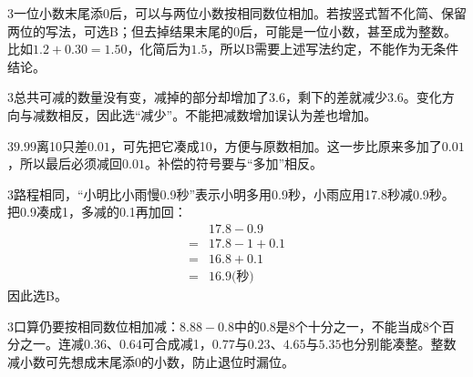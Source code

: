 \documentclass[multi=snippet,border={5bp 20bp 5bp 5bp}]{standalone}
\newenvironment{snippet}[3]{\begin{minipage}{#1bp}\color{answerred}\fontsize{#2}{#3}\selectfont\raggedright}{\end{minipage}}
\begin{document}
\begin{snippet}{505}{11.5}{14}\begin{multicols}{3}\raggedcolumns 一位小数末尾添0后，可以与两位小数按相同数位相加。若按竖式暂不化简、保留两位的写法，可选B；但去掉结果末尾的0后，可能是一位小数，甚至成为整数。比如\(1.2+0.30=1.50\)\allowbreak ，化简后为\(1.5\)\allowbreak ，所以B需要上述写法约定，不能作为无条件结论。\end{multicols}\end{snippet}
\begin{snippet}{505}{11.5}{14}\begin{multicols}{3}\raggedcolumns 总共可减的数量没有变，减掉的部分却增加了\(3.6\)\allowbreak ，剩下的差就减少\(3.6\)\allowbreak 。变化方向与减数相反，因此选“减少”。不能把减数增加误认为差也增加。\end{multicols}\end{snippet}
\begin{snippet}{505}{11.5}{14}\begin{multicols}{3}\raggedcolumns \(9.99\)\allowbreak 离10只差\(0.01\)\allowbreak ，可先把它凑成10，方便与原数相加。这一步比原来多加了\(0.01\)\allowbreak ，所以最后必须减回\(0.01\)\allowbreak 。补偿的符号要与“多加”相反。\end{multicols}\end{snippet}
\begin{snippet}{505}{11.5}{14}\begin{multicols}{3}\raggedcolumns 路程相同，“小明比小雨慢0.9秒”表示小明多用0.9秒，小雨应用17.8秒减0.9秒。把0.9凑成1，多减的0.1再加回：\[\begin{aligned}&17.8-0.9\\={}&17.8-1+0.1\\={}&16.8+0.1\\={}&16.9\text{(秒)}\end{aligned}\]因此选B。\end{multicols}\end{snippet}
\begin{snippet}{505}{11.5}{14}\begin{multicols}{3}\raggedcolumns 口算仍要按相同数位相加减：\(8.88-0.8\)\allowbreak 中的\(0.8\)\allowbreak 是8个十分之一，不能当成8个百分之一。连减\(0.36\)\allowbreak 、\(0.64\)\allowbreak 可合成减1，\(0.77\)\allowbreak 与\(0.23\)\allowbreak 、\(4.65\)\allowbreak 与\(5.35\)\allowbreak 也分别能凑整。整数减小数可先想成末尾添0的小数，防止退位时漏位。\end{multicols}\end{snippet}
\end{document}
